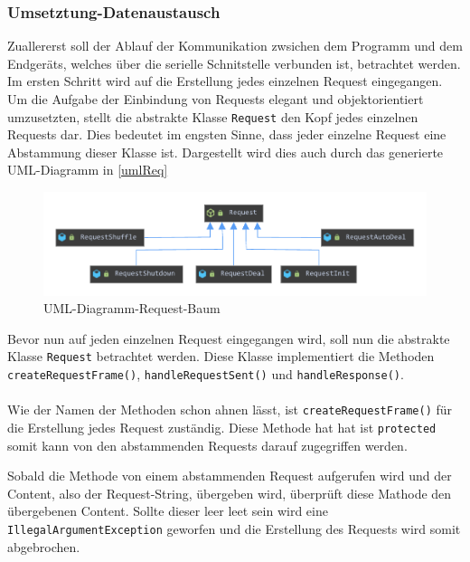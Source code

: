\subsubsection{Umsetztung-Datenaustausch}
Zuallererst soll der Ablauf der Kommunikation zwsichen dem Programm und dem Endgeräts, welches über die serielle Schnitstelle verbunden ist, betrachtet werden.
Im ersten Schritt wird auf die Erstellung jedes einzelnen Request eingegangen.\\
Um die Aufgabe der Einbindung von Requests elegant und objektorientiert umzusetzten, stellt die abstrakte Klasse \lstinline[style=java]{Request} den Kopf jedes einzelnen Requests dar.
Dies bedeutet im engsten Sinne, dass jeder einzelne Request eine Abstammung dieser Klasse ist.
Dargestellt wird dies auch durch das generierte UML-Diagramm in \autoref{umlReq}
\begin{figure}[H]
\centering
\vspace{-5mm}
\includegraphics[width=1\textwidth]{fig/ainf/RequestUML.pdf}
\caption{UML-Diagramm-Request-Baum}
\label{umlReq}
\end{figure}
Bevor nun auf jeden einzelnen Request eingegangen wird, soll nun die abstrakte Klasse \lstinline[style=java]{Request} betrachtet werden.
Diese Klasse implementiert die Methoden \lstinline[style=java]{createRequestFrame()}, \lstinline[style=java]{handleRequestSent()} und \lstinline[style=java]{handleResponse()}.\\\\
Wie der Namen der Methoden schon ahnen lässt, ist \lstinline[style=java]{createRequestFrame()} für die Erstellung jedes Request zuständig.
Diese Methode hat hat ist \lstinline[style=java]{protected} somit kann von den abstammenden Requests darauf zugegriffen werden.

Sobald die Methode von einem abstammenden Request aufgerufen wird und der Content, also der Request-String, übergeben wird, überprüft diese Mathode den übergebenen Content.
Sollte dieser leer leet sein wird eine \lstinline[style=java]{IllegalArgumentException} geworfen und die Erstellung des Requests wird somit abgebrochen.
